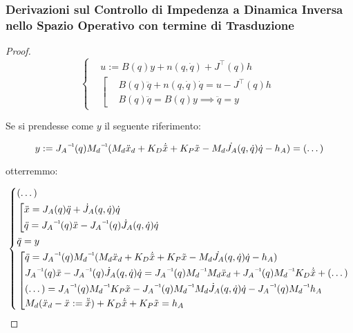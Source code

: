 \subsubsection{Derivazioni sul Controllo di Impedenza a Dinamica Inversa nello Spazio Operativo con termine di Trasduzione}

\begin{proof}

\[
	\left\{
	\begin{aligned}
	&u := B(q)y + n(q,\dot{q}) + J^\top(q)h\\
	&\left[
	\begin{aligned}
	&B(q)\ddot{q} + n(q,\dot{q})\dot{q} = u - J^\top(q)h\\
	&B(q)\ddot{q} = B(q)y \implies \ddot{q}=y
	\end{aligned}
	\right.
	\end{aligned}
	\right.
\]

Se si prendesse come $y$ il seguente riferimento:

\[
	y := \inv{J_A}(q)\inv{M_d}(M_d\ddot{x}_d + K_D\dot{\tilde{x}} + K_P\tilde{x} - M_d\dot{J_A}(q,\dot{q})\dot{q} - h_A) = (\dots)
\]

otterremmo:

\[
	\left\{
	\begin{aligned}
	&(\dots)\\
	&\left[
	\begin{aligned}
	&\ddot{x} = J_A(q)\ddot{q} + \dot{J}_A(q,\dot{q})\dot{q}\\
	&\ddot{q} = \inv{J_A}(q)\ddot{x} - \inv{J_A}(q)\dot{J}_A(q,\dot{q})\dot{q}
	\end{aligned}
	\right.\\
	&\ddot{q}=y\\
	&\left[
	\begin{aligned}
	&\ddot{q} = \inv{J_A}(q)\inv{M_d}(M_d\ddot{x}_d + K_D\dot{\tilde{x}} + K_P\tilde{x} - M_d\dot{J_A}(q,\dot{q})\dot{q} - h_A)\\
	&\inv{J_A}(q)\ddot{x} - \inv{J_A}(q)\dot{J}_A(q,\dot{q})\dot{q} = \inv{J_A}(q)\inv{M_d}M_d\ddot{x}_d + \inv{J_A}(q)\inv{M_d}K_D\dot{\tilde{x}} + (\dots)\\
	&(\dots) =  \inv{J_A}(q)\inv{M_d}K_P\tilde{x} - \inv{J_A}(q)\inv{M_d}M_d\dot{J}_A(q,\dot{q})\dot{q} - \inv{J_A}(q)\inv{M_d}h_A\\
	&M_d(\ddot{x}_d - \ddot{x} := \ddot{\tilde{x}}) + K_D\dot{\tilde{x}} + K_P\tilde{x} = h_A
	\end{aligned}
	\right.
	\end{aligned}
	\right.
\]

\end{proof}

